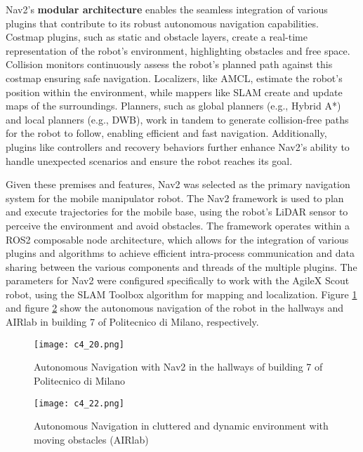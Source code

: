 Nav2's \textbf{modular architecture} enables the seamless integration of various plugins that contribute
to its robust autonomous navigation capabilities. Costmap plugins, such as static and obstacle layers,
create a real-time representation of the robot's environment, highlighting obstacles and free space. 
Collision monitors continuously assess the robot's planned path against this costmap ensuring safe navigation.
Localizers, like AMCL, estimate the robot's position within the environment, while mappers like SLAM create and update maps
of the surroundings. Planners, such as global planners (e.g., Hybrid A*) and local planners (e.g., DWB),
work in tandem to generate collision-free paths for the robot to follow, enabling efficient and fast navigation. 
Additionally, plugins like controllers and recovery behaviors further enhance Nav2's ability to handle unexpected
scenarios and ensure the robot reaches its goal.

Given these premises and features, Nav2 was selected as the primary navigation system for the mobile manipulator robot.
The Nav2 framework is used to plan and execute trajectories for the mobile base, using the robot's
LiDAR sensor to perceive the environment and avoid obstacles. The framework operates within a ROS2 
composable node architecture, which allows for the integration of various plugins and algorithms to achieve
efficient intra-process communication and data sharing between the various components and threads of the multiple plugins.
The parameters for Nav2 were configured specifically to work with the AgileX Scout robot, using the SLAM Toolbox algorithm
for mapping and localization. Figure \ref{fig:nav2_hallway} and figure \ref{fig:nav2_airlab} show the autonomous
navigation of the robot in the hallways and AIRlab in building 7 of Politecnico di Milano, respectively.

\begin{figure}[t]
    \centering
    \texttt{[image: c4\_20.png]}
    \caption{Autonomous Navigation with Nav2 in the hallways of building 7 of Politecnico di Milano}
    \label{fig:nav2_hallway}
\end{figure}

\begin{figure}[t]
    \centering
    \texttt{[image: c4\_22.png]}
    \caption{Autonomous Navigation in cluttered and dynamic environment with moving obstacles (AIRlab)}
    \label{fig:nav2_airlab}
\end{figure}

